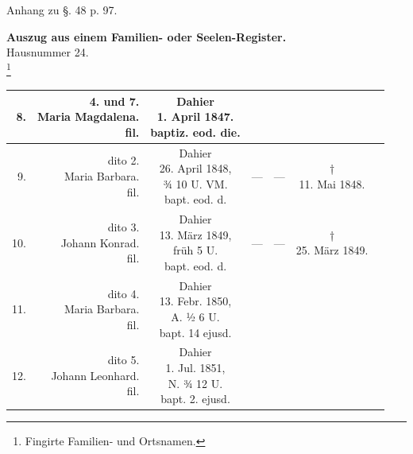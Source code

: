 \begin{quertabelle}
\noindent Anhang zu §. 48 p. 97.
\begin{center}
{\large\bfseries Auszug aus einem Familien- oder Seelen-Register.}\\[0.8em]
Hausnummer 24.\\[0.3em]
{\large {}\footnote{Fingirte Familien- und Ortsnamen.}}\\[0.6em]
\footnotesize
\begin{tabular}{|r|r|c|c|c|c|p{3.6cm}|}
\hline
8. & \zl{4. und 7.\\ Maria Magdalena.\\ fil.} & \zl{Dahier\\ 1. April 1847.\\ baptiz. eod. die.} & & & & \\ \hline
9. & \zl{dito 2.\\ Maria Barbara.\\ fil.} & \zl{Dahier\\ 26. April 1848,\\ ¾ 10 U. VM.\\ bapt. eod. d.} & — & — & \zl{†\\ 11. Mai 1848.} & \\ \hline
10. & \zl{dito 3.\\ Johann Konrad.\\ fil.} & \zl{Dahier\\ 13. März 1849,\\ früh 5 U.\\ bapt. eod. d.} & — & — & \zl{†\\ 25. März 1849.} & \\ \hline
11. & \zl{dito 4.\\ Maria Barbara.\\ fil.} & \zl{Dahier\\ 13. Febr. 1850,\\ A. ½ 6 U.\\ bapt. 14 ejusd.} & & & & \\ \hline
12. & \zl{dito 5.\\ Johann Leonhard.\\ fil.} & \zl{Dahier\\ 1. Jul. 1851,\\ N. ¾ 12 U.\\ bapt. 2. ejusd.} & & & & \\ \hline
\end{tabular}
\end{center}
\end{quertabelle}

